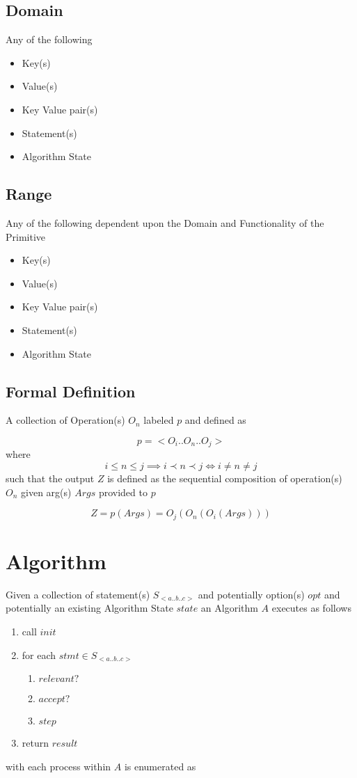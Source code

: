 \documentclass[../main.tex]{subfiles}
\begin{document}
\subsection{Domain}
Any of the following

\begin{itemize}
\item Key(s)
\item Value(s)
\item Key Value pair(s)
\item Statement(s)
\item Algorithm State
\end{itemize}

\subsection{Range}
Any of the following dependent upon the Domain and Functionality of the Primitive

\begin{itemize}
\item Key(s)
\item Value(s)
\item Key Value pair(s)
\item Statement(s)
\item Algorithm State
\end{itemize}

\subsection{Formal Definition}

A collection of Operation(s) $O_{n}$ labeled $p$ and defined as

$$p = <O_{i}..O_{n}..O_{j}>$$
where
$$i \leq n \leq j \implies i \prec n \prec j \iff i \not= n \not= j$$
such that the output $Z$ is defined as the sequential composition of operation(s) $O_{n}$ given arg(s) $Args$ provided to $p$

$$ Z = p(Args) = O_{j}(O_{n}(O_{i}(Args))) $$

\section{Algorithm}
Given a collection of statement(s) $S_{<a..b..c>}$ and potentially option(s) $opt$ and potentially an existing Algorithm State $state$ an Algorithm $A$ executes as follows

\begin{enumerate}
\item call $init$
\item for each $stmt \in S_{<a..b..c>}$
  \begin{enumerate}
  \item $relevant?$
  \item $accept?$
  \item $step$
  \end{enumerate}
\item return $result$
\end{enumerate}
with each process within $A$ is enumerated as
\end{document}
